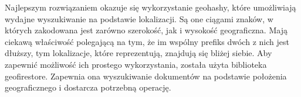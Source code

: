 Najlepszym rozwiązaniem okazuje się wykorzystanie geohashy, które umożliwiają wydajne wyszukiwanie na podstawie lokalizacji. Są one ciągami znaków, w których zakodowana jest zarówno szerokość, jak i wysokość geograficzna. Mają ciekawą właściwość polegającą na tym, że im wspólny prefiks dwóch z nich jest dłuższy, tym lokalizacje, które reprezentują, znajdują się bliżej siebie. Aby zapewnić możliwość ich prostego wykorzystania, została użyta biblioteka geofirestore. Zapewnia ona wyszukiwanie dokumentów na podstawie położenia geograficznego i dostarcza potrzebną operację.

